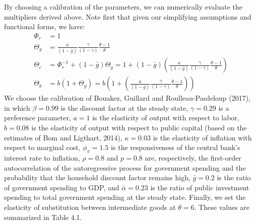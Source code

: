 \documentclass[12pt,letterpaper]{article}
\newcommand{\gbar}{\bar{g}}
\newcommand{\abar}{\bar{\alpha}}
\newcommand{\Theg}{\Theta_g}
\newcommand{\Thec}{\Theta_c}
\newcommand{\Thek}{\Theta_k}
\newcommand{\Phir}{\Phi_r}
\begin{document}
By choosing a calibration of the parameters, we can numerically evaluate the multipliers derived above. Note first that given our simplifying assumptions and functional forms, we have:
\begin{align*}
\Phir &= 1\\
\Theg &= \frac{a}{(1-\gbar)}\frac{\gamma}{(1-\gamma)}\frac{\theta-1}{\theta}\\
\Thec &= \Phir^{-1} + (1-\gbar)\Theg = 1 + (1-\gbar)\left(\frac{a}{(1-\gbar)}\frac{\gamma}{(1-\gamma)}\frac{\theta-1}{\theta}\right)\\
\Thek &= b(1+\Theg) = b\left(1 + \left(\frac{a}{(1-\gbar)}\frac{\gamma}{(1-\gamma)}\frac{\theta-1}{\theta}\right)\right)
\end{align*}
We choose the calibration of Bouakez, Guillard and Roulleau-Pasdeloup (2017), in which $\beta = 0.99$ is the discount factor at the steady state, $\gamma = 0.29$ is a preference parameter, $a = 1$ is the elasticity of output with respect to labor, $b = 0.08$ is the elasticity of output with respect to public capital (based on the estimates of Bom and Ligthart, 2014), $\kappa = 0.03$ is the elasticity of inflation with respect to marginal cost, $\phi_\pi = 1.5$ is the responsiveness of the central bank's interest rate to inflation, $\rho = 0.8$ and $p = 0.8$ are, respectively, the first-order autocorrelation of the autoregressive process for government spending and the probability that the household discount factor remains high, $\gbar = 0.2$ is the ratio of government spending to GDP, and $\abar = 0.23$ is the ratio of public investment spending to total government spending at the steady state. Finally, we set the elasticity of substitution between intermediate goods at $\theta = 6$. These values are summarized in Table 4.1.
\end{document}
